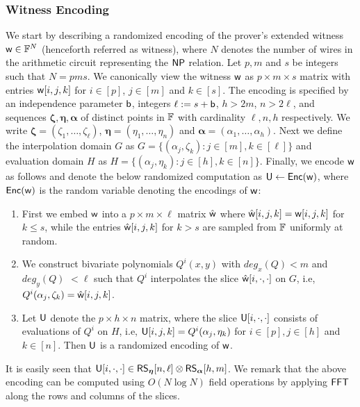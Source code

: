 \subsubsection{Witness Encoding}\label{subsec:witencoding}
We start by describing a randomized encoding of the prover's extended witness $\mathsf{w}\in \mathbb{F}^N$ (henceforth referred as witness), where $N$ denotes the number of wires in the arithmetic circuit representing the $\mathsf{NP}$ relation. Let $p,m$ and $s$ be integers such that $N=pms$. We canonically view the witness $\mathsf{w}$ as $p\times m\times s$ matrix with entries $\mathsf{w}[i,j,k]$ for $i\in [p]$, $j\in [m]$ and $k\in [s]$. The encoding is specified by an independence parameter $\mathsf{b}$, integers $\ell := s+\mathsf{b}$, $h>2m$, $n>2\ell$, and sequences $\bm{\zeta},\bm{\eta},\bm{\alpha}$ of distinct points in $\mathbb{F}$ with cardinality $\ell,n,h$ respectively. We write $\bm{\zeta}=(\zeta_1,\ldots,\zeta_\ell)$, $\bm{\eta}=(\eta_1,\ldots,\eta_n)$ and $\bm{\alpha}=(\alpha_1,\ldots,\alpha_h)$. 
Next we define the interpolation domain $G$ as $G=\{(\alpha_j,\zeta_k): j\in[m], k\in [\ell]\}$ and evaluation domain $H$ as $H=\{(\alpha_j,\eta_k): j\in [h],
k\in [n]\}$. Finally, we encode $\mathsf{w}$ as follows and denote the below randomized computation as $\mathsf{U}\leftarrow \mathsf{Enc}(\mathsf{w})$, where  $\mathsf{Enc}(\mathsf{w})$ is the random variable denoting the encodings of $\mathsf{w}$:
\begin{enumerate}[{\rm (i)}]
	\item First we embed $\mathsf{w}$ into a $p\times m\times \ell$ matrix $\hat{\mathsf{w}}$ where $\hat{\mathsf{w}}[i,j,k]=\mathsf{w}[i,j,k]$ for $k\leq s$, while the entries $\hat{\mathsf{w}}[i,j,k]$ for $k>s$ are sampled from $\mathbb{F}$ uniformly at random.
	\item We construct bivariate polynomials $Q^i(x,y)$ with $deg_x(Q)<m$ and $deg_y(Q) $ $<\ell$ such that $Q^i$ interpolates the slice $\hat{\mathsf{w}}[i,\cdot,\cdot]$ on $G$, i.e,
	$Q^i(\alpha_j,\zeta_k)=\hat{\mathsf{w}}[i,j,k]$.
	\item Let $\mathsf{U}$ denote the $p\times h\times n$ matrix, where the slice $\mathsf{U}[i,\cdot,\cdot]$ consists of evaluations of $Q^i$ on $H$, i.e, $\mathsf{U}[i,j,k]=Q^i(\alpha_j,\eta_k)$ for $i\in [p], j\in [h]$ and $k\in [n]$. Then $\mathsf{U}$ is a randomized encoding of $\mathsf{w}$.
\end{enumerate}
It is easily seen that $\mathsf{U}[i,\cdot,\cdot]\in \mathsf{RS}_{\bm{\eta}}[n,\ell]\otimes \mathsf{RS}_{\bm{\alpha}}[h,m]$. We remark that the above encoding can be computed using $O(N\log N)$ field operations by applying $\mathsf{FFT}$ along the rows and columns of the slices.

